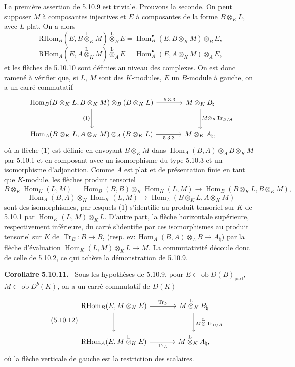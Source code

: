 \documentclass[11pt]{article}
\newenvironment{statement}[1]{\par\medskip\noindent\textbf{#1.}\ }{\par\medskip}
\DeclareMathOperator{\Hom}{Hom}
\newcommand{\ob}{\operatorname{ob}}
\providecommand{\RHom}{\mathrm{RHom}}
\providecommand{\Tr}{\operatorname{Tr}}
\providecommand{\Tr}{\operatorname{Tr}}
\providecommand{\lten}{\overset{\mathrm L}{\otimes}}
\providecommand{\Tr}{\operatorname{Tr}}
\providecommand{\RHom}{\mathrm{RHom}}
\providecommand{\Hom}{\operatorname{Hom}}
\providecommand{\ob}{\operatorname{ob}}
\providecommand{\lten}{\overset{\mathrm L}{\otimes}}
\providecommand{\RHom}{\mathrm R\mathcal{H}om}
\providecommand{\lten}{\overset{\mathrm L}{\otimes}}
\providecommand{\Tr}{\operatorname{Tr}}
\providecommand{\lten}{\overset{\mathrm L}{\otimes}}
\providecommand{\lten}{\overset{\mathrm L}{\otimes}}
\providecommand{\lten}{\overset{\mathrm L}{\otimes}}
\begin{document}
La première assertion de 5.10.9 est triviale. Prouvons la seconde. On peut supposer $M$ à composantes injectives et $E$ à composantes de la forme $B\otimes_KL$, avec $L$ plat. On a alors
\[
\RHom_B(E,B\lten_KM)\lten_BE=\Hom_B^\bullet(E,B\otimes_KM)\otimes_BE,
\]
\[
\RHom_A(E,A\lten_KM)\lten_AE=\Hom_A^\bullet(E,A\otimes_KM)\otimes_AE,
\]
et les flèches de 5.10.10 sont définies au niveau des complexes. On est donc ramené à vérifier que, si $L$, $M$ sont des $K$-modules, $E$ un $B$-module à gauche, on a un carré commutatif
\[
\begin{tikzcd}[column sep=large,row sep=large]
\Hom_B(B\otimes_KL,B\otimes_KM)\otimes_B(B\otimes_KL) \arrow[r,"5.3.3"] \arrow[d,"(1)"'] & M\otimes_KB_\natural \arrow[d,"M\otimes_K\Tr_{B/A}"]\\
\Hom_A(B\otimes_KL,A\otimes_KM)\otimes_A(B\otimes_KL) \arrow[r,"5.3.3"'] & M\otimes_KA_\natural,
\end{tikzcd}
\]
où la flèche (1) est définie en envoyant $B\otimes_KM$ dans $\Hom_A(B,A)\otimes_AB\otimes_KM$ par 5.10.1 et en composant avec un isomorphisme du type 5.10.3 et un isomorphisme d'adjonction. Comme $A$ est plat et de présentation finie en tant que $K$-module, les flèches produit tensoriel
\[
B\otimes_K\Hom_K(L,M)=\Hom_B(B,B)\otimes_K\Hom_K(L,M)\to\Hom_B(B\otimes_KL,B\otimes_KM),
\]
\[
\Hom_A(B,A)\otimes_K\Hom_K(L,M)\to\Hom_A(B\otimes_KL,A\otimes_KM)
\]
sont des isomorphismes, par lesquels (1) s'identifie au produit tensoriel sur $K$ de 5.10.1 par $\Hom_K(L,M)\otimes_KL$. D'autre part, la flèche horizontale supérieure, respectivement inférieure, du carré s'identifie par ces isomorphismes au produit tensoriel sur $K$ de $\Tr_B:B\to B_\natural$ (resp. $\mathrm{ev}:\Hom_A(B,A)\otimes_AB\to A_\natural$) par la flèche d'évaluation $\Hom_K(L,M)\otimes_KL\to M$. La commutativité découle donc de celle de 5.10.2, ce qui achève la démonstration de 5.10.9.

\begin{statement}{Corollaire 5.10.11}
Sous les hypothèses de 5.10.9, pour $E\in\ob D(B)_{\mathrm{parf}}$, $M\in\ob D^b(K)$, on a un carré commutatif de $D(K)$
\begin{equation}\tag{5.10.12}
\begin{tikzcd}[column sep=large,row sep=large]
\RHom_B(E,M\lten_KE) \arrow[r,"\Tr_B"] \arrow[d] & M\lten_KB_\natural \arrow[d,"M\lten\Tr_{B/A}"]\\
\RHom_A(E,M\lten_KE) \arrow[r,"\Tr_A"'] & M\lten_KA_\natural,
\end{tikzcd}
\end{equation}
où la flèche verticale de gauche est la restriction des scalaires.
\end{statement}
\end{document}

